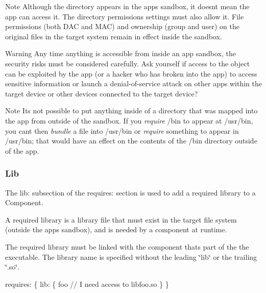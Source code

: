 \begin{DoxyNote}{Note}
Although the directory appears in the app\textquotesingle{}s sandbox, it doesn\textquotesingle{}t mean the app can access it. The directory permissions settings must also allow it. File permissions (both D\+A\+C and M\+A\+C) and ownership (group and user) on the original files in the target system remain in effect inside the sandbox.
\end{DoxyNote}
\begin{DoxyWarning}{Warning}
Any time anything is accessible from inside an app sandbox, the security risks must be considered carefully. Ask yourself if access to the object can be exploited by the app (or a hacker who has broken into the app) to access sensitive information or launch a denial-\/of-\/service attack on other apps within the target device or other devices connected to the target device?
\end{DoxyWarning}
\begin{DoxyNote}{Note}
It\textquotesingle{}s not possible to put anything inside of a directory that was mapped into the app from outside of the sandbox. If you {\itshape require} {\ttfamily /bin} to appear at {\ttfamily /usr/bin}, you can\textquotesingle{}t then {\itshape bundle} a file into {\ttfamily /usr/bin} or {\itshape require} something to appear in {\ttfamily /usr/bin}; that would have an effect on the contents of the /bin directory outside of the app.
\end{DoxyNote}
\hypertarget{def_files_cdef_defFilesCdef_requiresLib}{}\subsubsection{Lib}\label{def_files_cdef_defFilesCdef_requiresLib}
The {\ttfamily lib\+:} subsection of the {\ttfamily requires\+:} section is used to add a required library to a Component.

A required library is a library file that must exist in the target file system (outside the app\textquotesingle{}s sandbox), and is needed by a component at runtime.

The required library must be linked with the component that\textquotesingle{}s part of the the executable. The library name is specified without the leading \char`\"{}lib\char`\"{} or the trailing \char`\"{}.\+so\char`\"{}.


\begin{DoxyCode}
requires:
\{
    lib:
    \{
        foo    \textcolor{comment}{// I need access to libfoo.so}
    \}
\}
\end{DoxyCode}


